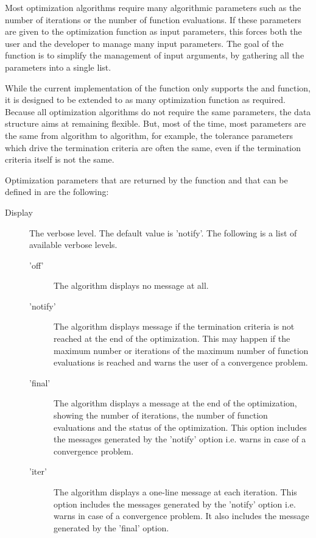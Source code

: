 \begin{Details}\relax
Most optimization algorithms require many algorithmic parameters such as the
number of iterations or the number of function evaluations. If these
parameters are given to the optimization function as input parameters, this
forces both the user and the developer to manage many input parameters. The
goal of the  function is to simplify the management of input
arguments, by gathering all the parameters into a single list.

While the current implementation of the  function only supports
the  and  function, it is designed to be 
extended to as many optimization function as required. Because all 
optimization algorithms do not require the same parameters, the data structure 
aims at remaining flexible. But, most of the time, most parameters are the 
same from algorithm to algorithm, for example, the tolerance parameters which 
drive the termination criteria are often the same, even if the termination 
criteria itself is not the same.

Optimization parameters that are returned by the  function and
that can be defined in  are the following: \begin{description}

\item[Display] The verbose level. The default value is 'notify'. The following
is a list of available verbose levels.\begin{description}

\item['off'] The algorithm displays no message at all.
\item['notify'] The algorithm displays message if the termination criteria
is not reached at the end of the optimization. This may happen if the
maximum number or iterations of the maximum number of function
evaluations is reached and warns the user of a convergence problem.
\item['final'] The algorithm displays a message at the end of the
optimization, showing the number of iterations, the number of function
evaluations and the status of the optimization. This option includes the
messages generated by the 'notify' option i.e. warns in case of a
convergence problem.
\item['iter'] The algorithm displays a one-line message at each iteration.
This option includes the messages generated by the 'notify' option i.e.
warns in case of a convergence problem. It also includes the message
generated by the 'final' option.


\end{description}
\end{description}
\end{Details}
